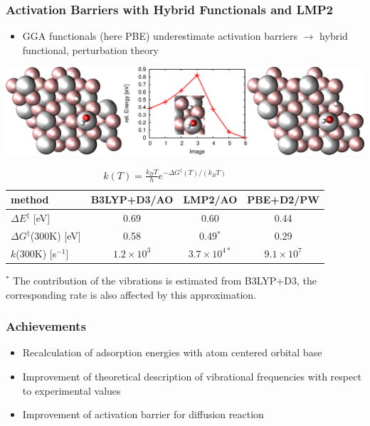 \documentclass[hyperref={pdfpagelabels=false}]{beamer}
\begin{document}
\begin{frame}
 \frametitle{Activation Barriers with Hybrid Functionals and LMP2}
 \begin{itemize}
  \item GGA functionals (here PBE) underestimate activation barriers $\rightarrow$ hybrid functional, perturbation theory
 \end{itemize}
 \centering
   \includegraphics[width=.75\textwidth]{figures/df-h-4-2.pdf}
     \vspace{-.5cm}
     \pause
\begin{table}[!h]
  \centering
  \caption{$k(T)=\frac{k_BT}{h}e^{-\Delta G^\ddagger(T)/(k_BT)}$}
  \vspace{-.5cm}
  \begin{tabular}{l|cc|c}%
  \toprule
    method& B3LYP+D3/AO&LMP2/AO &PBE+D2/PW\\\midrule
   $\Delta E^\ddagger$ [eV] &0.69 & 0.60&0.44\\
   $\Delta G^\ddagger$(300K) [eV]&0.58 & 0.49$^\ast$ &0.29\\
   $k$(300K) [s$^{-1}$]&$1.2\times 10^3$ & $3.7\times 10^{4\ast}$&$9.1\times 10^7$\\\bottomrule 
  \end{tabular}
\end{table}
$^\ast$ The contribution of the vibrations is estimated from B3LYP+D3, the corresponding rate is also affected by this approximation.
\end{frame} 

\begin{frame}
 \frametitle{Achievements}
 \begin{itemize}
  \item Recalculation of adsorption energies with atom centered orbital base
  \item Improvement of theoretical description of vibrational frequencies with respect to experimental values
  \item Improvement of activation barrier for diffusion reaction
 \end{itemize}
 \newline~\newline~\newline
 \centering
\end{frame}
\end{document}
